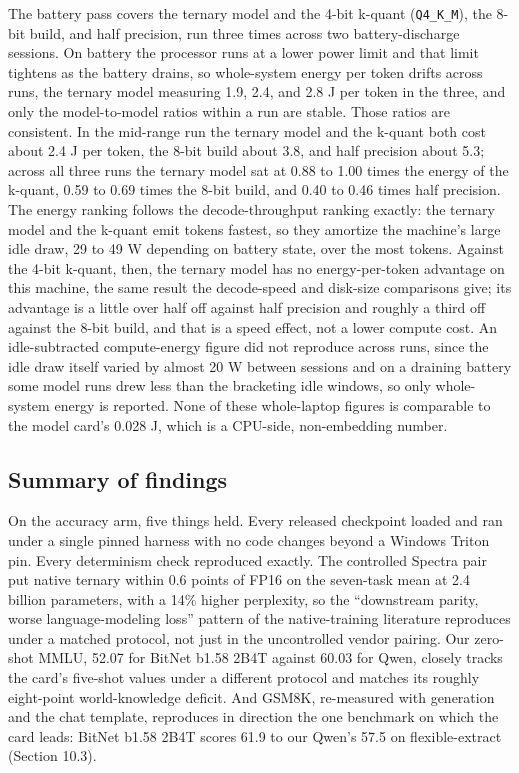 \documentclass[11pt]{article}
\begin{document}
The battery pass covers the ternary model and the 4-bit k-quant (\texttt{Q4\_K\_M}), the 8-bit
build, and half precision, run three times across two battery-discharge sessions. On
battery the processor runs at a lower power limit and that limit tightens as the battery
drains, so whole-system energy per token drifts across runs, the ternary model measuring
1.9, 2.4, and 2.8 J per token in the three, and only the model-to-model ratios within a
run are stable. Those ratios are consistent. In the mid-range run the ternary model and
the k-quant both cost about 2.4 J per token, the 8-bit build about 3.8, and half
precision about 5.3; across all three runs the ternary model sat at 0.88 to 1.00 times
the energy of the k-quant, 0.59 to 0.69 times the 8-bit build, and 0.40 to 0.46 times
half precision. The energy ranking follows the decode-throughput ranking exactly: the
ternary model and the k-quant emit tokens fastest, so they amortize the machine's large
idle draw, 29 to 49 W depending on battery state, over the most tokens. Against the 4-bit
k-quant, then, the ternary model has no energy-per-token advantage on this machine, the
same result the decode-speed and disk-size comparisons give; its advantage is a little
over half off against half precision and roughly a third off against the 8-bit build, and
that is a speed effect, not a lower compute cost. An idle-subtracted compute-energy
figure did not reproduce across runs, since the idle draw itself varied by almost 20 W
between sessions and on a draining battery some model runs drew less than the bracketing
idle windows, so only whole-system energy is reported. None of these whole-laptop figures
is comparable to the model card's 0.028 J, which is a CPU-side, non-embedding number.

\subsection{Summary of findings}

On the accuracy arm, five things held. Every released checkpoint loaded and ran under a
single pinned harness with no code changes beyond a Windows Triton pin. Every determinism
check reproduced exactly. The controlled Spectra pair put native ternary within 0.6
points of FP16 on the seven-task mean at 2.4 billion parameters, with a 14\% higher
perplexity, so the ``downstream parity, worse language-modeling loss'' pattern of the
native-training literature reproduces under a matched protocol, not just in the
uncontrolled vendor pairing. Our zero-shot MMLU, 52.07 for BitNet b1.58 2B4T against
60.03 for Qwen, closely tracks the card's five-shot values under a different protocol
and matches its roughly eight-point
world-knowledge deficit. And GSM8K, re-measured with generation and the chat template,
reproduces in direction the one benchmark on which the card leads: BitNet b1.58 2B4T scores 61.9 to
our Qwen's 57.5 on flexible-extract (Section 10.3).
\end{document}

